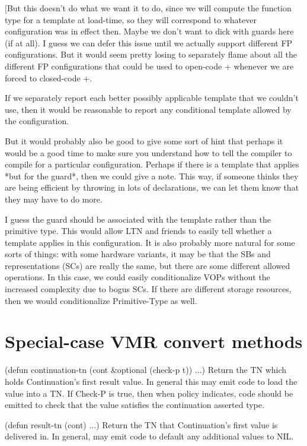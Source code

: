 [But this doesn't do what we want it to do, since we will compute the
function type for a template at load-time, so they will correspond to whatever
configuration was in effect then.  Maybe we don't want to dick with guards here
(if at all).  I guess we can defer this issue until we actually support
different FP configurations.  But it would seem pretty losing to separately
flame about all the different FP configurations that could be used to open-code
+ whenever we are forced to closed-code +.

If we separately report each better possibly applicable template that we
couldn't use, then it would be reasonable to report any conditional template
allowed by the configuration.  

But it would probably also be good to give some sort of hint that perhaps it
would be a good time to make sure you understand how to tell the compiler to
compile for a particular configuration.  Perhaps if there is a template that
applies *but for the guard*, then we could give a note.  This way, if someone
thinks they are being efficient by throwing in lots of declarations, we can let
them know that they may have to do more.

I guess the guard should be associated with the template rather than the
primitive type.  This would allow LTN and friends to easily tell whether a
template applies in this configuration.  It is also probably more natural for
some sorts of things: with some hardware variants, it may be that the SBs and
representations (SCs) are really the same, but there are some different allowed
operations.  In this case, we could easily conditionalize VOPs without the
increased complexity due to bogus SCs.  If there are different storage
resources, then we would conditionalize Primitive-Type as well.


\section{Special-case VMR convert methods}

    (defun continuation-tn (cont \&optional (check-p t))
      ...)
Return the TN which holds Continuation's first result value.  In general
this may emit code to load the value into a TN.  If Check-P is true, then
when policy indicates, code should be emitted to check that the value satisfies
the continuation asserted type.

    (defun result-tn (cont)
      ...)
Return the TN that Continuation's first value is delivered in.  In general,
may emit code to default any additional values to NIL.

